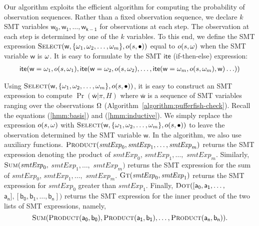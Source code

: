 Our algorithm exploits the efficient algorithm for computing the
probability of observation sequences. Rather than a fixed observation
sequence, we declare $k$ SMT variables $\mathsf{w_0}, \mathsf{w_1},
\ldots, \mathsf{w_{k-1}}$ for observations at each step. The
observation at each step is determined by one of the $k$ variables. To
this end, we define the SMT expression
$\textmd{\textsc{Select}} (\mathsf{w}, \{ \omega_1, \omega_2, \ldots,
\omega_m\}, o (s, \bullet))$  equal to $o (s, \omega)$ when the SMT
variable $\mathsf{w}$ is $\omega$. It is easy to formulate by
the SMT $\mathsf{ite}$ (if-then-else) expression:
\begin{align*}
  \mathsf{ite} (\mathsf{w} = \omega_1, o (s, \omega_1),
  \mathsf{ite} (\mathsf{w} = \omega_2, o (s, \omega_2),
  \ldots
  ,\mathsf{ite} (\mathsf{w} = \omega_m, o (s, \omega_m), \mathsf{w})
  \ldots))
\end{align*}

Using $\textmd{\textsc{Select}} (\mathsf{w}, \{ \omega_1, \omega_2,
\ldots, \omega_m\}, o (s, \bullet))$, it is easy to construct an SMT
expression to compute $\Pr (\overline{\mathsf{w}} | \pi, H)$ where
$\overline{\mathsf{w}}$ is a sequence of SMT variables ranging over
the observations $\Omega$ (Algorithm~\ref{algorithm:pufferfish-check}).
Recall the equations (\ref{hmm:basis}) and (\ref{hmm:inductive}). We
simply replace the expression $o (s, \omega)$ with
$\textmd{\textsc{Select}} (\mathsf{w}, \{ \omega_1, \omega_2, \ldots,
\omega_m\}, o (s, \bullet))$ to leave the observation determined by the
SMT variable $\mathsf{w}$. In the algorithm, we also use auxiliary
functions.
$\textmd{\textsc{Product}}(\mathit{smtExp}_0, \mathit{smtExp}_1,
\ldots, \mathit{smtExp}_m)$
returns the SMT expression denoting the product of
$\mathit{smtExp}_0$, $\mathit{smtExp}_1, \ldots,$
$\mathit{smtExp}_m$. Similarly,
$\textmd{\textsc{Sum}}(\mathit{smtExp}_0,$ $\mathit{smtExp}_1, \ldots,$
$\mathit{smtExp}_m)$ returns the SMT expression for the sum
of $\mathit{smtExp}_0$, $\mathit{smtExp}_1, \ldots,$
$\mathit{smtExp}_m$. $\textmd{\textsc{Gt}} (\mathit{smtExp}_0,
\mathit{smtExp}_1)$ returns the SMT expression for
$\mathit{smtExp}_0$ greater than $\mathit{smtExp}_1$.
Finally,
$\textmd{\textsc{Dot}} ([\mathsf{a_0}, \mathsf{a_1}, \ldots,$
$\mathsf{a_n}], [\mathsf{b_0}, \mathsf{b_1}, \ldots, \mathsf{b_n}])$
returns the SMT expression for the inner product of the two lists of
SMT expressions, namely,
\[
  \textmd{\textsc{Sum}} (
  \textmd{\textsc{Product}}(\mathsf{a_0}, \mathsf{b_0}),
  \textmd{\textsc{Product}}(\mathsf{a_1}, \mathsf{b_1}),
  \ldots,
  \textmd{\textsc{Product}}(\mathsf{a_n}, \mathsf{b_n})
  ).
\]

